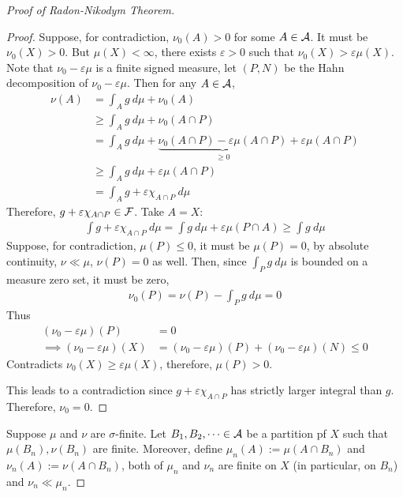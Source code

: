 \documentclass[11pt]{article}
\newcommand{\dmu}[0]{\ d\mu}
\begin{document}
\begin{proof}[Proof of Radon-Nikodym Theorem]
\begin{tcolorbox}
\begin{proof}
				Suppose, for contradiction, $\nu_0(A) > 0$ for some $A \in \mathcal{{A}}$. It must be $\nu_0(X) > 0$. But $\mu(X) < \infty$, there exists $\varepsilon > 0$ such that $\nu_0(X) > \varepsilon \mu(X)$.
				Note that $\nu_0 - \varepsilon\mu$ is a finite signed measure, let $(P, N)$ be the Hahn decomposition of $\nu_0 - \varepsilon\mu$.
				Then for any $A \in \mathcal{{A}}$,
				\begin{align}
					\nu(A) &= \int_A g\dmu + \nu_0(A) \\
					&\geq \int_A g\dmu + \nu_0(A\cap P) \\
					&= \int_A g\dmu + \underbrace{\nu_0(A\cap P) - \varepsilon \mu(A \cap P)}_{\geq 0} + \varepsilon \mu(A \cap P) \\
					&\geq \int_A g\dmu + \varepsilon \mu(A \cap P) \\
					&=\int_A g + \varepsilon \chi_{A \cap P}\dmu
				\end{align}
				Therefore, $g + \varepsilon \chi_{A \cap P} \in \mathcal{{F}}$. Take $A = X$:
				\begin{align}
					\int g + \varepsilon \chi_{A \cap P}\dmu = \int g\dmu + \varepsilon \mu(P \cap A) \geq \int g\dmu 
				\end{align}
				Suppose, for contradiction, $\mu(P) \leq 0$, it must be $\mu(P) = 0$, by absolute continuity, $\nu \ll \mu$, $\nu(P) = 0$ as well.
				Then, since $\int_P g\dmu$ is bounded on a measure zero set, it must be zero,
				\begin{align}
					\nu_0(P) = \nu(P) - \int_P g\dmu = 0
				\end{align}
				Thus
				\begin{align}
					(\nu_0 - \varepsilon \mu)(P) &= 0 \\
					\implies (\nu_0 - \varepsilon \mu)(X) &= (\nu_0 - \varepsilon \mu)(P) + (\nu_0 - \varepsilon \mu)(N) \leq 0
				\end{align}
				Contradicts $\nu_0(X) \geq \varepsilon \mu(X)$, therefore, $\mu(P) > 0$.
				
				This leads to a contradiction since $g + \varepsilon \chi_{A \cap P}$ has strictly larger integral than $g$. Therefore, $\nu_0 = 0$.
			\end{proof}
		\end{tcolorbox}
		Suppose $\mu$ and $\nu$ are $\sigma$-finite. Let $B_1, B_2, \dots \in \mathcal{{A}}$ be a partition pf $X$ such that $\mu(B_n), \nu(B_n)$ are finite. Moreover, define $\mu_n(A) := \mu(A\cap B_n)$ and $\nu_n(A) := \nu(A \cap B_n)$, both of $\mu_n$ and $\nu_n$ are finite on $X$ (in particular, on $B_n$) and $\nu_n \ll \mu_n$.
		

\end{proof}
\end{document}
